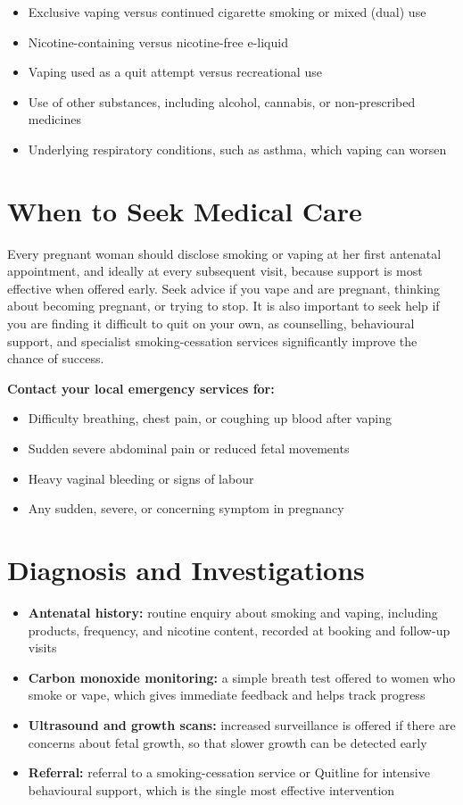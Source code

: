 \begin{itemize}
    \item Exclusive vaping versus continued cigarette smoking or mixed (dual) use
    \item Nicotine-containing versus nicotine-free e-liquid
    \item Vaping used as a quit attempt versus recreational use
    \item Use of other substances, including alcohol, cannabis, or non-prescribed medicines
    \item Underlying respiratory conditions, such as asthma, which vaping can worsen
\end{itemize}

\section*{When to Seek Medical Care}
Every pregnant woman should disclose smoking or vaping at her first antenatal appointment, and ideally at every subsequent visit, because support is most effective when offered early. Seek advice if you vape and are pregnant, thinking about becoming pregnant, or trying to stop. It is also important to seek help if you are finding it difficult to quit on your own, as counselling, behavioural support, and specialist smoking-cessation services significantly improve the chance of success.

\textbf{Contact your local emergency services for:}
\begin{itemize}
    \item Difficulty breathing, chest pain, or coughing up blood after vaping
    \item Sudden severe abdominal pain or reduced fetal movements
    \item Heavy vaginal bleeding or signs of labour
    \item Any sudden, severe, or concerning symptom in pregnancy
\end{itemize}

\section*{Diagnosis and Investigations}
\begin{itemize}
    \item \textbf{Antenatal history:} routine enquiry about smoking and vaping, including products, frequency, and nicotine content, recorded at booking and follow-up visits
    \item \textbf{Carbon monoxide monitoring:} a simple breath test offered to women who smoke or vape, which gives immediate feedback and helps track progress
    \item \textbf{Ultrasound and growth scans:} increased surveillance is offered if there are concerns about fetal growth, so that slower growth can be detected early
    \item \textbf{Referral:} referral to a smoking-cessation service or Quitline for intensive behavioural support, which is the single most effective intervention
\end{itemize}

